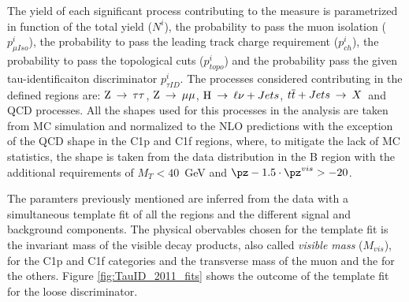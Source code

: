 The yield of each significant process contributing to the measure is parametrized in function of the total yield ($N^i$), the probability to pass the muon isolation ($p_{\mu Iso}^i$), the probability to pass the leading track charge requirement ($p_{ch}^i$), the probability to pass the topological cuts ($p_{topo}^i$) and the probability pass the given tau-identificaiton discriminator $p_{\tau ID}^i$. The processes considered contributing in the defined regions are: $\mathrm{Z}\:\rightarrow\:\tau\tau$, $\mathrm{Z}\:\rightarrow\:\mu\mu$, $\mathrm{H}\:\rightarrow\:\ell\nu+Jets$, $t\overline{t}+Jets\:\rightarrow\: X$\ and QCD processes. All the shapes used for this processes in the analysis are taken from MC simulation and normalized to the NLO predictions with the exception of the QCD shape in the C1p and C1f regions, where, to mitigate the lack of MC statistics, the shape is taken from the data distribution in the B region with the additional requirements of $M_T < 40$\ GeV and $\pz -1.5 \cdot \pz^{vis} > -20$. 

The paramters previously mentioned are inferred from the data with a simultaneous template fit of all the regions and the different signal and background components. The physical obervables chosen for the template fit is the invariant mass of the visible decay products, also called \emph{visible mass} ($M_{vis}$), for the C1p and C1f categories and the transverse mass of the muon and the \MET for the others. Figure \ref{fig:TauID_2011_fits} shows the outcome of the template fit for the loose discriminator.

